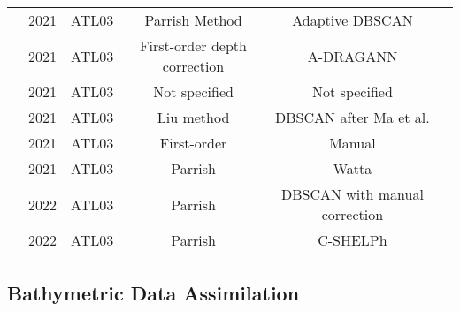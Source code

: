 \begin{landscape}
\begin{table}
\begin{tabular}{rccccc}
                  \citeauthor{Xie2021}               & 2021 & ATL03   & Parrish Method                & Adaptive DBSCAN               \\ %
                  \citeauthor{Cao2021}               & 2021 & ATL03   & First-order depth correction  & A-DRAGANN                     \\ %
                  \citeauthor{Lee2021}               & 2021 & ATL03   & Not specified                 & Not specified                 \\ %
                  \citeauthor{Liu2021}               & 2021 & ATL03   & Liu method                    & DBSCAN after Ma et al.        \\ %
                  \citeauthor{Coveney2021a}               &2021  &ATL03   & First-order               & Manual    \\ %
                  \citeauthor{Datta2021}             & 2021 & ATL03   & Parrish                       & Watta                         \\ %
                  \citeauthor{LeQuilleuc2022b}       & 2022 & ATL03   & Parrish                       & DBSCAN with manual correction \\ %
                  \citeauthor{Thomas2022}            & 2022 & ATL03   & Parrish                       & C-SHELPh                      \\
                  \bottomrule
            \end{tabular}
      \end{table}

\end{landscape}
\restoregeometry

\subsection{Bathymetric Data Assimilation}

